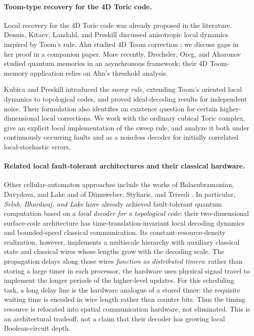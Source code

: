 \paragraph{Toom-type recovery for the 4D Toric code.}
Local recovery for the 4D Toric code was already proposed in the literature. Dennis, Kitaev, Landahl, and Preskill \cite{Dennis_2002} discussed anisotropic local dynamics inspired by Toom's rule. Ahn studied 4D Toom correction \cite{Ahn2004}; we discuss gaps in her proof in a companion paper. More recently, Drechsler, Oreg, and Aharonov \cite{DrechslerOregAharonov2026} studied quantum memories in an asynchronous framework; their 4D Toom-memory application relies on Ahn's threshold analysis. 

Kubica and Preskill \cite{Kubica_2019} introduced the \emph{sweep rule}, extending Toom's oriented local dynamics to topological codes, and proved ideal-decoding results for independent noise. Their formulation also identifies an existence question for certain higher-dimensional local corrections. We work with the ordinary cubical Toric complex, give an explicit local implementation of the sweep rule, and analyze it both under continuously occurring faults and as a noiseless decoder for initially correlated local-stochastic errors.

\paragraph{Related local fault-tolerant architectures and their classical hardware.}
Other cellular-automaton approaches include the works of Balasubramanian, Davydova, and Lake and of D\"unnweber, Styliaris, and Trivedi \cite{Balasubramanian_2026,dünnweber2026quantummemoryautonomouscomputation}. In particular, \emph{Selub, Bhardwaj, and Lake} \cite{SelubBhardwajLake2026} have already achieved fault-tolerant quantum computation based on a \emph{local decoder for a topological code}: their two-dimensional surface-code architecture has time-translation-invariant local decoding dynamics and bounded-speed classical communication. Its constant-resource-density realization, however, implements a multiscale hierarchy with auxiliary classical state and classical wires whose lengths grow with the decoding scale. The propagation delays along those wires \emph{function as distributed timers}: rather than storing a large timer in each processor, the hardware uses physical signal travel to implement the longer periods of the higher-level updates. For this scheduling task, a long delay line is the hardware analogue of a stored timer: the requisite waiting time is encoded in wire length rather than counter bits. Thus the timing resource is relocated into spatial communication hardware, not eliminated. This is an architectural tradeoff, not a claim that their decoder has growing local Boolean-circuit depth.

